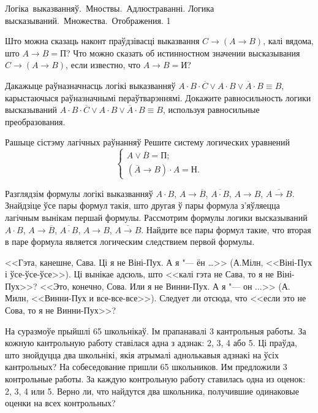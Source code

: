 



\quizTitle
{Логіка~выказванняў.~Мноствы.~Адлюстраванні.}
{Логика высказываний.~Множества.~Отображения.}
{1}

\begin{problemList}

\problemItemSimple
{Што можна сказаць наконт праўдзівасці выказвання  $C \to (A \to B)$, калі вядома, што $A \to B = \mbox{П}$?}
{Что можно сказать об истинностном значении высказывания $C \to (A \to B)$, если известно, что $A \to B = \mbox{И}$?}

\bigskip

\problemItemSimple
{Дакажыце раўназначнасць логікі выказванняў $A \cdot B \cdot \overline{C} \vee A \cdot B \vee \overline{A} \cdot B \equiv B$, карыстаючыся раўназначнымі пераўтварэннямі.}
{Докажите равносильность логики высказываний $A \cdot B \cdot \overline{C} \vee A \cdot B \vee \overline{A} \cdot B \equiv B$, используя равносильные преобразования.}

\bigskip

\problemItemWithCommonPart
{Рашыце сістэму лагічных раўнанняў}
{Решите систему логических уравнений}
{\[\begin{cases} A \vee \overline{B} = \mbox{П}; \\ (\overline{A} \to B) \cdot A = \mbox{Н}. \end{cases}\]}

\smallskip

\problemItemSimple
{Разглядзім формулы логікі выказванняў $A \cdot B$, $A \to \overline{B}$, $\overline{A \cdot B}$, $A \to B$, $\overline{A \to B}$. Знайдзіце ўсе пары формул такія, што другая ў пары формула з'яўляецца лагічным вынікам першай формулы.}
{Рассмотрим формулы логики высказываний $A \cdot B$, $A \to \overline{B}$, $\overline{A \cdot B}$, $A \to B$, $\overline{A \to B}$. Найдите все пары формул такие, что вторая в паре формула является логическим следствием первой формулы.}

\bigskip

\problemItemSimple
{<<Гэта, канешне, Сава. Ці я не Віні-Пух. А я "--- ён \dots>> (А.Мілн, <<Віні-Пух і ўсе-ўсе-ўсе>>). Ці вынікае адсюль, што <<калі гэта не Сава, то я не Віні-Пух>>?}
{<<Это, конечно, Сова. Или я не Винни-Пух. А я "--- он $\ldots$>> (А. Милн, <<Винни-Пух и все-все-все>>). Следует ли отсюда, что <<если это не Сова, то я не Винни-Пух>>?}

\bigskip

\problemItemSimple
{На суразмоўе прыйшлі 65 школьнікаў. Ім прапанавалі 3 кантрольныя работы. За кожную кантрольную работу ставілася адна з адзнак: 2, 3, 4 або 5. Ці праўда, што знойдуцца два школьнікі, якія атрымалі аднолькавыя адзнакі на ўсіх кантрольных?}
{На собеседование пришли 65 школьников. Им предложили 3 контрольные работы. За каждую контрольную работу ставилась одна из оценок: 2, 3, 4 или 5. Верно ли, что найдутся два школьника, получившие одинаковые оценки на всех контрольных?}


\end{problemList}
